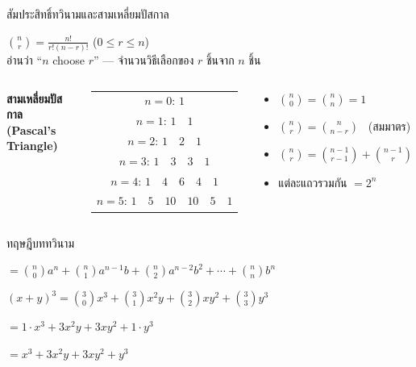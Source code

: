 \documentclass[11pt, aspectratio=169]{beamer}
\begin{document}
\begin{frame}{สัมประสิทธิ์ทวินามและสามเหลี่ยมปัสกาล}
  \begin{explanation}
    $\displaystyle\binom{n}{r} = \frac{n!}{r!(n-r)!}$ \quad ($0 \leq r \leq n$)
    \\ อ่านว่า ``$n$ choose $r$'' — จำนวนวิธีเลือกของ $r$ ชิ้นจาก $n$ ชิ้น
  \end{explanation}

  \begin{columns}[T]
      \centering
      \textbf{สามเหลี่ยมปัสกาล (Pascal's Triangle)}

      \begin{tabular}{c}
        $n=0$: \quad $1$ \\
        $n=1$: \quad $1 \quad 1$ \\
        $n=2$: \quad $1 \quad 2 \quad 1$ \\
        $n=3$: \quad $1 \quad 3 \quad 3 \quad 1$ \\
        $n=4$: \quad $1 \quad 4 \quad 6 \quad 4 \quad 1$ \\
        $n=5$: \quad $1 \quad 5 \quad 10 \quad 10 \quad 5 \quad 1$
      \end{tabular}

      \begin{explanation}[สมบัติ]
        \begin{itemize}
          \item $\binom{n}{0} = \binom{n}{n} = 1$
          \item $\binom{n}{r} = \binom{n}{n-r}$ \ (สมมาตร)
          \item $\binom{n}{r} = \binom{n-1}{r-1} + \binom{n-1}{r}$
          \item แต่ละแถวรวมกัน $= 2^n$
        \end{itemize}
      \end{explanation}
  \end{columns}
\end{frame}

\begin{frame}{ทฤษฎีบททวินาม}
  \begin{explanation}[ทฤษฎีบท]

    \medskip
    $= \binom{n}{0}a^n + \binom{n}{1}a^{n-1}b + \binom{n}{2}a^{n-2}b^2 + \cdots + \binom{n}{n}b^n$
  \end{explanation}

  \begin{exambox}[ตัวอย่าง: $(x+y)^3$]
    $(x+y)^3 = \binom{3}{0}x^3 + \binom{3}{1}x^2y + \binom{3}{2}xy^2 + \binom{3}{3}y^3$

    $= 1 \cdot x^3 + 3x^2y + 3xy^2 + 1 \cdot y^3$

    $= x^3 + 3x^2y + 3xy^2 + y^3$
  \end{exambox}
\end{frame}
\end{document}
